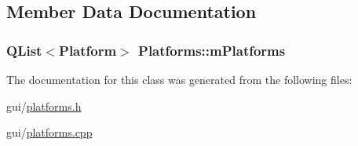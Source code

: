 \subsection{Member Data Documentation}
\hypertarget{class_platforms_ab57594d1bf838179c8f8191caa16984f}{
\subsubsection[{m\-Platforms}]{\setlength{\rightskip}{0pt plus 5cm}Q\-List$<${\bf Platform}$>$ Platforms\-::m\-Platforms}}\label{class_platforms_ab57594d1bf838179c8f8191caa16984f}


The documentation for this class was generated from the following files\-:\begin{DoxyCompactItemize}
\item 
gui/\hyperlink{platforms_8h}{platforms.\-h}\item 
gui/\hyperlink{platforms_8cpp}{platforms.\-cpp}\end{DoxyCompactItemize}
